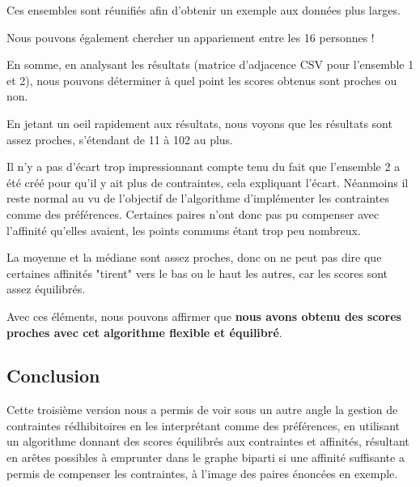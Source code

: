 \documentclass{mytex}
\begin{document}
Ces ensembles sont réunifiés afin d'obtenir un exemple aux données plus larges.

Nous pouvons également chercher un appariement entre les 16 personnes !




En somme, en analysant les résultats (matrice d'adjacence CSV pour l'ensemble 1 et 2), nous pouvons déterminer à quel point les scores obtenus sont proches ou non.


En jetant un oeil rapidement aux résultats, nous voyons que les résultats sont assez proches, s'étendant de 11 à 102 au plus.


Il n'y a pas d'écart trop impressionnant compte tenu du fait que l'ensemble 2 a été créé pour qu'il y ait plus de contraintes, cela expliquant l'écart. Néanmoins il reste normal au vu de l'objectif de l'algorithme d'implémenter les contraintes comme des préférences. Certaines paires n'ont donc pas pu compenser avec l'affinité qu'elles avaient, les points communs étant trop peu nombreux.


La moyenne et la médiane sont assez proches, donc on ne peut pas dire que certaines affinités "tirent" vers le bas ou le haut les autres, car les scores sont assez équilibrés.

Avec ces éléments, nous pouvons affirmer que \textbf{nous avons obtenu des scores proches avec cet algorithme flexible et équilibré}.

\subsection{Conclusion}
Cette troisième version nous a permis de voir sous un autre angle la gestion de contraintes rédhibitoires en les interprétant comme des préférences, en utilisant un algorithme donnant des scores équilibrés aux contraintes et affinités, résultant en arêtes possibles à emprunter dans le graphe biparti si une affinité suffisante a permis de compenser les contraintes, à l'image des paires énoncées en exemple.

\merci
\end{document}

